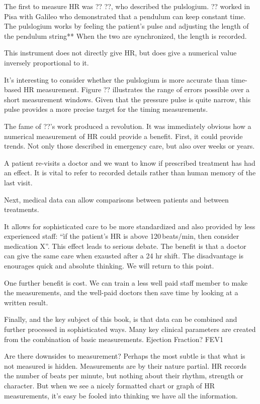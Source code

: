 {{{{{{{The first to measure HR was ?? ??, who described the pulslogium.
?? worked in Pisa with Galileo who demonstrated that a pendulum can keep constant time. The pulslogium works by feeling the patient's pulse and adjusting the length of the pendulum string**
When the two are synchronized, the length is recorded.

This instrument does not directly give HR, but does give a numerical value inversely proportional to it.

It's interesting to consider whether the pulslogium is more accurate than time-based HR measurement. 
Figure ?? illustrates the range of errors possible over a short measurement windows. Given that the pressure pulse is quite narrow, this pulse provides a more precise target for the timing measurements.

The fame of ??'s work produced a revolution. It was immediately obvious how a numerical measurement of HR could provide a benefit. First, it could provide trends. Not only those described in emergency care, but also over weeks or years.

A patient re-visits a doctor and we want to know if prescribed treatment has had an effect. It is vital to refer to recorded details rather than human memory of the last visit.

Next, medical data can allow comparisons between patients and between treatments. 

It allows for sophisticated care to be more standardized and also provided by less experienced staff:
``ìf the patient's HR is above 120\,beats/min, then consider medication X''.
This effect leads to serious debate. The benefit is that a doctor can give the same care when exausted after a 24 hr shift. The disadvantage is enourages quick and absolute thinking. We will return to this point.

One further benefit is cost. We can train a less well paid staff member to make the measurements, and the well-paid doctors then save time by looking at a written result. 

Finally, and the key subject of this book, is that data can be combined and further processed in sophisticated ways. Many key clinical parameters are created from the combination of basic measurements.
 Ejection Fraction?
 FEV1

Are there downsides to measurement? Perhaps the most subtle is that what is not measured is hidden. Measurements are by their nature partial. HR records the number of beats per minute, but nothing about their rhythm, strength or character. But when we see a nicely formatted chart or graph of HR measurements, it's easy be fooled into thinking we have all the information.

}}}}}}}
